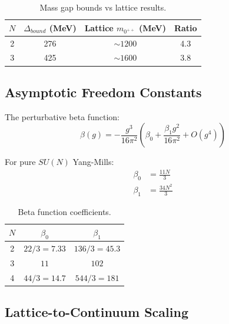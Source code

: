 \begin{table}[ht]
\centering
\begin{tabular}{|c|c|c|c|}
\hline
$N$ & $\Delta_{bound}$ (MeV) & Lattice $m_{0^{++}}$ (MeV) & Ratio \\
\hline
2 & 276 & $\sim 1200$ & 4.3 \\
3 & 425 & $\sim 1600$ & 3.8 \\
\hline
\end{tabular}
\caption{Mass gap bounds vs lattice results.}
\label{tab:gap-comparison}
\end{table}

\subsection{Asymptotic Freedom Constants}

\begin{theorem}
\label{thm:beta-coefficients}
The perturbative beta function:
\begin{equation}
\beta(g) = -\frac{g^3}{16\pi^2} \left( \beta_0 + \frac{\beta_1 g^2}{16\pi^2} + O(g^4) \right)
\end{equation}

For pure $SU(N)$ Yang-Mills:
\begin{align}
\beta_0 &= \frac{11N}{3} \\
\beta_1 &= \frac{34N^2}{3}
\end{align}
\end{theorem}

\begin{table}[ht]
\centering
\begin{tabular}{|c|c|c|}
\hline
$N$ & $\beta_0$ & $\beta_1$ \\
\hline
2 & $22/3 = 7.33$ & $136/3 = 45.3$ \\
3 & $11$ & $102$ \\
4 & $44/3 = 14.7$ & $544/3 = 181$ \\
\hline
\end{tabular}
\caption{Beta function coefficients.}
\label{tab:beta-coeffs}
\end{table}

\subsection{Lattice-to-Continuum Scaling}

